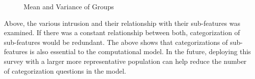 \begin{figure}[htp]
\hspace{1em}
\newline
\centering
{}
\caption{Mean and Variance of Groups}
\label{fig:st3}
\end{figure}

Above, the various intrusion and their relationship with their sub-features was examined. If there was a constant relationship between both, categorization of sub-features would be redundant. The above shows that categorizations of sub-features is also essential to the computational model. In the future, deploying this survey with a larger more representative population can help reduce the number of categorization questions in the model.


